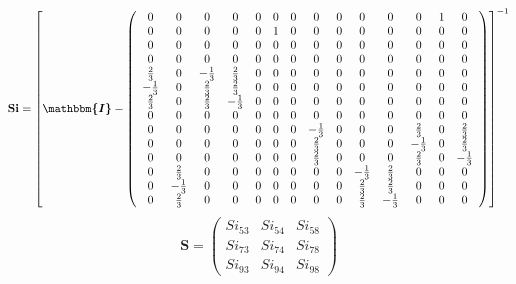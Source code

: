 \[ \mathbf{Si} = \left[ \boldsymbol{\mathbbm{I}}  -
\left(\begin{array}{cccccccccccccc} 0 & 0 & 0 & 0 & 0 & 0 & 0 & 0 & 0
& 0 & 0 & 0 & 1 & 0 \\ 0 & 0 & 0 & 0 & 0 & 1 & 0 & 0 & 0 & 0 & 0 & 0 &
0 & 0 \\ 0 & 0 & 0 & 0 & 0 & 0 & 0 & 0 & 0 & 0 & 0 & 0 & 0 & 0 \\ 0 &
0 & 0 & 0 & 0 & 0 & 0 & 0 & 0 & 0 & 0 & 0 & 0 & 0 \\ \frac{2}{3} & 0 &
-\frac{1}{3} & \frac{2}{3} & 0 & 0 & 0 & 0 & 0 & 0 & 0 & 0 & 0 & 0 \\
-\frac{1}{3} & 0 & \frac{2}{3} & \frac{2}{3} & 0 & 0 & 0 & 0 & 0 & 0 &
0 & 0 & 0 & 0 \\ \frac{2}{3} & 0 & \frac{2}{3} & -\frac{1}{3} & 0 & 0
& 0 & 0 & 0 & 0 & 0 & 0 & 0 & 0 \\ 0 & 0 & 0 & 0 & 0 & 0 & 0 & 0 & 0 &
0 & 0 & 0 & 0 & 0 \\ 0 & 0 & 0 & 0 & 0 & 0 & 0 & -\frac{1}{3} & 0 & 0
& 0 & \frac{2}{3} & 0 & \frac{2}{3} \\ 0 & 0 & 0 & 0 & 0 & 0 & 0 &
\frac{2}{3} & 0 & 0 & 0 & -\frac{1}{3} & 0 & \frac{2}{3} \\ 0 & 0 & 0
& 0 & 0 & 0 & 0 & \frac{2}{3} & 0 & 0 & 0 & \frac{2}{3} & 0 &
-\frac{1}{3} \\ 0 & \frac{2}{3} & 0 & 0 & 0 & 0 & 0 & 0 & 0 &
-\frac{1}{3} & \frac{2}{3} & 0 & 0 & 0 \\ 0 & -\frac{1}{3} & 0 & 0 & 0
& 0 & 0 & 0 & 0 & \frac{2}{3} & \frac{2}{3} & 0 & 0 & 0 \\ 0 &
\frac{2}{3} & 0 & 0 & 0 & 0 & 0 & 0 & 0 & \frac{2}{3} & -\frac{1}{3} &
0 & 0 & 0 \end{array}\right) \right]^{-1} \]
\[ \mathbf{S} = \left(\begin{array}{ccc} Si_{53} & Si_{54} & Si_{58}
\\ Si_{73} & Si_{74} & Si_{78} \\ Si_{93} & Si_{94} & Si_{98}
\end{array}\right) \]
